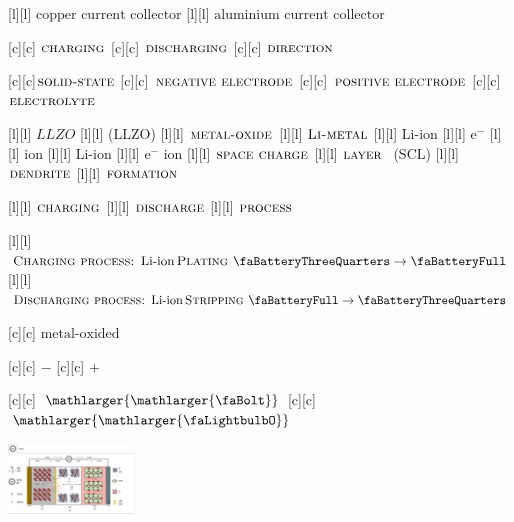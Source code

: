 [l][l]  {\footnotesize $\text{copper current collector}$}
[l][l] {\footnotesize $\text{aluminium current collector}$}

[c][c]  {\scriptsize $\textsc{charging}$}
[c][c] {\scriptsize $\textsc{discharging}$}
[c][c] {\scriptsize $\textsc{direction}$}

[c][c]{\scriptsize $\textsc{solid-state}$}
[c][c] {\scriptsize $\textsc{negative electrode}$}
[c][c] {\scriptsize $\textsc{positive electrode}$}
[c][c] {\scriptsize $\textsc{electrolyte}$}

[l][l]  {\tiny $LLZO$}
[l][l] {\tiny (LLZO)}
[l][l] {\tiny $\textsc{metal-oxide}$}
[l][l]  {\tiny $\textsc{Li-metal}$}
[l][l] {\tiny Li-ion}
[l][l] {\tiny $\text{e}^{-}$}
[l][l] {\tiny $\text{ion}$}
[l][l] {\tiny Li-ion}
[l][l] {\tiny $\text{e}^{-}$ ion}
[l][l]  {\tiny $\textsc{space charge}$}
[l][l]  {\tiny $\textsc{layer }$ (SCL)}
[l][l]   {\tiny $\textsc{dendrite}$}
[l][l]  {\tiny $\textsc{formation}$}

[l][l]  {\tiny $\textsc{charging}$}
[l][l] {\tiny $\textsc{discharge}$}
[l][l]  {\tiny $\textsc{process}$}

[l][l] {$\textsc{Charging process: }\text{Li-ion}\,\textsc{Plating }
		\text{\faBatteryThreeQuarters} \rightarrow \text{\faBatteryFull}$}
[l][l] {$\textsc{Discharging process: }\text{Li-ion}\,\textsc{Stripping }
		\text{\faBatteryFull} \rightarrow \text{\faBatteryThreeQuarters}$}

[c][c] {$\text{metal-oxided}$}

[c][c] {$-$}
[c][c] {$+$}

[c][c] {$\mathlarger{\mathlarger{\text{\faBolt}}}$}
[c][c] {$\mathlarger{\mathlarger{\text{\faLightbulbO}}}$}

\includegraphics[width=0.25\textwidth]{batt3dswell_scaled_2ways_discharging_color.eps}